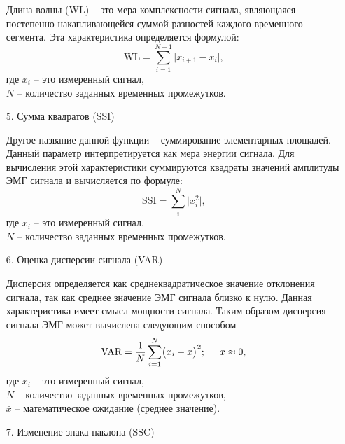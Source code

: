 \begin{itemize}[parsep=0.4em]
        Длина волны (WL) – это мера комплексности сигнала, являющаяся постепенно накапливающейся суммой разностей каждого временного сегмента. Эта характеристика определяется формулой:
        \begin{equation}
            \text{WL} = \sum\limits_{i=1}^{N-1}\bigl|x_{i+1}-x_i\bigr|,
        \end{equation}
        где $x_i$ -- это измеренный сигнал,\\ \phantom{где} $N$ -- количество заданных временных промежутков.

    \item[5.] Сумма квадратов (SSI)

        Другое название данной функции – суммирование элементарных площадей. Данный параметр интерпретируется как мера энергии сигнала. Для вычисления этой характеристики суммируются квадраты значений амплитуды ЭМГ сигнала и вычисляется по формуле:
        \begin{equation}
            \text{SSI} = \sum\limits_{i}^N\bigl|x_i^2\bigr|,
        \end{equation}
        где $x_i$ -- это измеренный сигнал,\\ \phantom{где} $N$ -- количество заданных временных промежутков.

    \item[6.] Оценка дисперсии сигнала (VAR)

        Дисперсия определяется как среднеквадратическое значение отклонения сигнала, так как среднее значение ЭМГ сигнала близко к нулю. Данная характеристика имеет смысл мощности сигнала. Таким образом дисперсия сигнала ЭМГ может вычислена следующим способом
        \begin{equation}
            \text{VAR} = \dfrac{1}{N}\sum\limits_{i=1}^N\bigl(x_i-\bar{x}\bigr)^2;\hspace{0.5cm}\bar{x}\approx 0,
        \end{equation}
        где $x_i$ -- это измеренный сигнал,\\ \phantom{где} $N$ -- количество заданных временных промежутков,\\ \phantom{где} $\bar{x}$ -- математическое ожидание (среднее значение).

    \item[7.] Изменение знака наклона (SSC)


\end{itemize}
